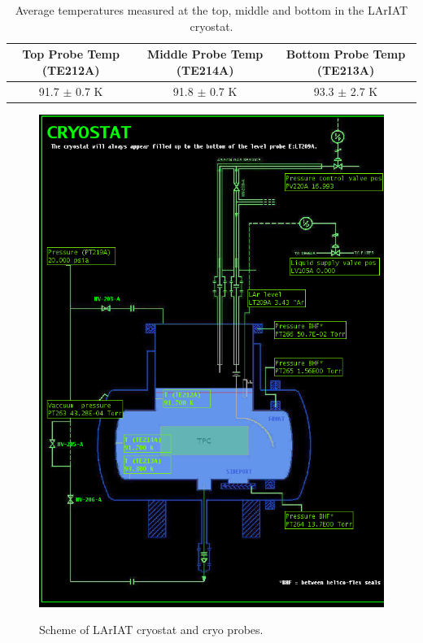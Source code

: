\begin{table}[h!]
\centering
\caption{Average temperatures measured at the top, middle and bottom in the LArIAT cryostat.}
\label{tab:temp}
\begin{tabular}{|c|c|c|}
\hline
Top Probe Temp (TE212A) & Middle Probe Temp (TE214A)   & Bottom Probe Temp (TE213A)  \\ \hline
91.7 $\pm$ 0.7 K &  91.8 $\pm$ 0.7 K                   & 93.3 $\pm$ 2.7 K       \\ \hline
\end{tabular}
\end{table}

\begin{figure}[htb]
\centering
\includegraphics[scale=0.45]{./images/cryopic.png}\\
\caption{Scheme of LArIAT cryostat and cryo probes.}
\label{fig:cryo}
\end{figure}

